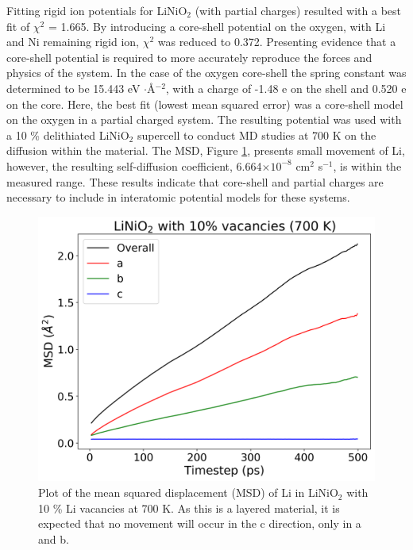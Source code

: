 \documentclass[journal=jacsat,manuscript=article]{achemso}
\begin{document}
Fitting  rigid ion potentials for LiNiO$_2$ (with partial charges) resulted with a best fit of $\chi^2$ = 1.665.
By introducing a core-shell potential on the oxygen, with Li and Ni remaining rigid ion, $\chi^2$ was reduced to 0.372. 
Presenting evidence that a core-shell potential is required to more accurately reproduce the forces and physics of the system. In the case of the oxygen core-shell the spring constant was determined to be 15.443 eV $\cdot$\AA$^{-2}$, with a charge of -1.48 e on the shell and 0.520 e on the core.
Here, the best fit (lowest mean squared error) was a core-shell model on the oxygen in a partial charged system. The resulting potential was used with a 10 \% delithiated LiNiO$_2$ supercell to conduct MD studies at 700 K on the diffusion within the material. The MSD, Figure \ref{fig:MSD_LiNiO2}, presents small movement of Li, however, the resulting self-diffusion coefficient, 6.664$\times 10^{-8}$  cm$^{2}$ s$^{-1}$, is within the measured range. \cite{Nakamura2000,bruce1992vacancy}
These results indicate that core-shell and partial charges are necessary to include in interatomic potential models for these systems. 
%

\begin{figure}
    \centering
    \includegraphics[scale=0.45]{Figures/MSD_LiNiO2.png}
    \caption{\label{fig:MSD_LiNiO2} Plot of the mean squared displacement (MSD) of Li in LiNiO$_2$ with 10 \% Li vacancies at 700 K. As this is a layered material, it is expected that no movement will occur in the c direction, only in a and b.}
\end{figure}
\end{document}
